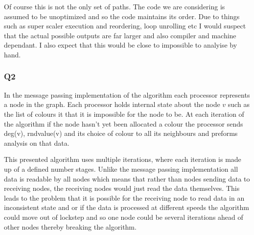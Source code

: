 \documentclass[11pt,a4paper]{article}
\begin{document}
Of course this is not the only set of paths. The code we are
considering is assumed to be unoptimized and so the code maintains its order. Due to things
such as super scaler execution and reordering, loop unrolling etc I
would suspect that the actual possible outputs are far larger and also
compiler and machine dependant. I also expect that this would be close
to impossible to analyise by hand.

\newpage
\subsubsection*{Q2}


In the message passing implementation of the algorithm each processor
represents a node in the graph. Each processor holds internal state
about the node $v$ such as the list of colours it that it is impossible
for the node to be. At each iteration of the algorithm if the node
hasn't yet been allocated a colour the processor sends deg(v),
rndvalue(v) and its choice of colour to all its neighbours and preforms
analysis on that data.

This presented algorithm uses multiple iterations, where each iteration is
made up of a defined number stages. Unlike the message passing
implementation all data is readable by all nodes which means that rather
than nodes sending data to receiving nodes, the receiving nodes would
just read the data themselves. This leads to the problem that it is
possible for the receiving node to read data in an inconsistent state
and or if the data is processed at different speeds the algorithm could
move out of lockstep and so one node could be several iterations ahead
of other nodes thereby breaking the algorithm.
\end{document}
